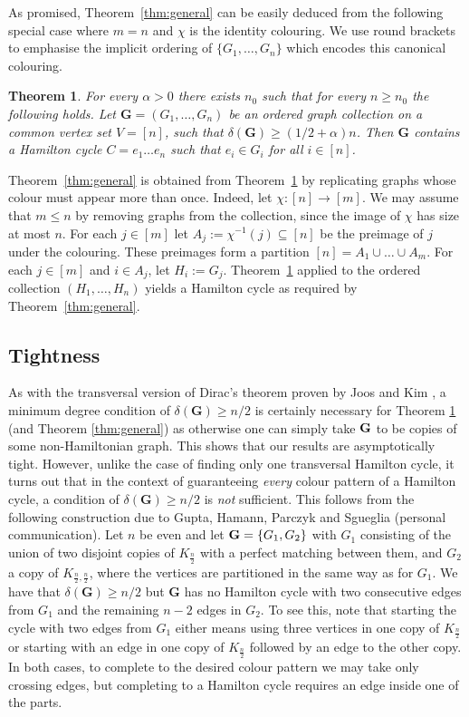 \documentclass[11pt, dvipsnames]{amsart}
\theoremstyle{plain}
\newtheorem{theo}{Theorem}[section]
\theoremstyle{definition}
\newcommand{\mbf}[1]{\mathbf{#1}}
\begin{document}
As promised, Theorem~\ref{thm:general} can be easily deduced from the following special case where $m=n$ and $\chi$ is the identity colouring. We use round brackets to emphasise the implicit ordering of $\{G_1,\ldots,G_n\}$ which encodes this canonical colouring. 

\begin{theo}\label{thm:main} For every $\alpha>0$ there exists $n_0$ such that for every $n \geq n_0$ the following holds.
Let $\mbf{G}=(G_1, \ldots, G_n)$ be an ordered graph collection on a common vertex set $V=[n]$, such that $\delta(\mathbf{G})\geq (1/2+\alpha)n$. Then $\mathbf{G}$ contains a Hamilton cycle $C=e_1\ldots e_n$ such that $e_i\in G_i$ for all $i\in[n]$.
\end{theo}

Theorem~\ref{thm:general} is obtained from Theorem~\ref{thm:main} by replicating graphs whose colour must appear more than once. Indeed, 
let $\chi:[n] \to [m]$. We may assume that $m \leq n$ by removing graphs from the collection, since the image of $\chi$ has size at most $n$.
For each $j\in[m]$ let $A_j:=\chi^{-1}(j)\subseteq [n]$ be the preimage of $j$ under the colouring. These preimages form a partition $[n]=A_1 \cup \ldots \cup A_m$.
For each $j\in[m]$ and $i\in A_j$, let $H_i:=G_{j}$.
Theorem~\ref{thm:main} applied to the ordered collection $(H_1,\ldots,H_n)$ yields a Hamilton cycle as required by Theorem~\ref{thm:general}.


\subsection{Tightness }
\label{sec:counterex}
 As with the transversal version of Dirac's theorem proven by Joos and Kim \cite{jooskim}, a minimum degree condition of $\delta(\mathbf{G})\geq n/2$ is certainly necessary for Theorem \ref{thm:main} (and Theorem \ref{thm:general}) as otherwise one can simply take $\bf{G}$ to be copies of some non-Hamiltonian graph. 
 This shows that our results are asymptotically tight. 
 However, unlike the case of finding only one transversal Hamilton cycle, it turns out that in the context of guaranteeing \emph{every} colour pattern of a Hamilton cycle, a condition of $\delta(\mathbf{G})\geq n/2$ is \emph{not} sufficient. This follows from the following construction due to Gupta, Hamann, Parczyk and Sgueglia (personal communication).  Let $n$ be even and let ${\bf{G}}=\{G_1,G_2\}$ with $G_1$ consisting of the union of two disjoint copies of $K_{\frac{n}{2}}$ with a perfect matching between them, and $G_2$ a copy of $K_{\frac{n}{2}, \frac{n}{2}}$, where the vertices are partitioned in the same way as for $G_1$. We have that $\delta(\mathbf{G})\geq n/2$ but $\mathbf{G}$ has no  Hamilton cycle with two consecutive edges from $G_1$ and the remaining $n-2$ edges in $G_2$. To see this, note that starting the cycle with two edges from $G_1$ either means using three vertices in one copy of $K_{\frac{n}{2}}$ or starting with an edge in one copy of $K_{\frac{n}{2}}$ followed by an edge to the other copy. In both cases, to complete to the desired colour pattern we may take only crossing edges, but completing to a Hamilton cycle requires an edge inside one of the parts. 
 
\end{document}

